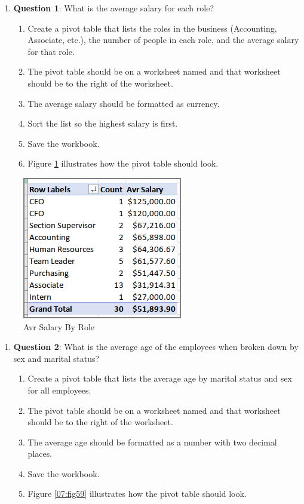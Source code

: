 \begin{enumerate}
	\item{\textbf{Question 1}: What is the average salary for each role?}
	
	\begin{enumerate}
		\item Create a pivot table that lists the roles in the business (Accounting, Associate, etc.), the number of people in each role, and the average salary for that role.
		\item The pivot table should be on a worksheet named  and that worksheet should be to the right of the  worksheet.
		\item The average salary should be formatted as currency. 
		\item Sort the list so the highest salary is first. 
		\item Save the workbook.
		\item Figure \ref{07:fig58} illustrates how the pivot table should look.
	\end{enumerate}

\end{enumerate}

\begin{figure}[H]
	\centering
	\includegraphics[width=\maxwidth{.95\linewidth}]{gfx/ch07_fig58}
	\caption{Avr Salary By Role}
	\label{07:fig58}
\end{figure}

\begin{enumerate}[resume]
	\item{\textbf{Question 2}: What is the average age of the employees when broken down by sex and marital status?}
	
	\begin{enumerate}
		\item Create a pivot table that lists the average age by marital status and sex for all employees.
		\item The pivot table should be on a worksheet named  and that worksheet should be to the right of the  worksheet.
		\item The average age should be formatted as a number with two decimal places. 
		\item Save the workbook.
		\item Figure \ref{07:fig59} illustrates how the pivot table should look.
	\end{enumerate}
	
\end{enumerate}

